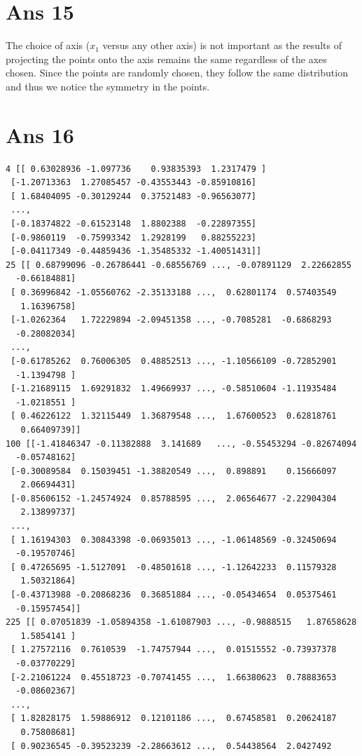 \documentclass[10pt]{article}
\begin{document}
\section*{Ans 15}
\begin{flushleft}
The choice of axis ($x_{1}$ versus any other axis) is not important as the results of projecting the points onto the axis remains the same regardless of the axes chosen. Since the points are randomly chosen, they follow the same distribution and thus we notice the symmetry in the points.\\
\end{flushleft}
\section*{Ans 16}
\begin{flushleft}
\begin{lstlisting}
4 [[ 0.63028936 -1.097736    0.93835393  1.2317479 ]
 [-1.20713363  1.27085457 -0.43553443 -0.85910816]
 [ 1.68404095 -0.30129244  0.37521483 -0.96563077]
 ..., 
 [-0.18374822 -0.61523148  1.8802388  -0.22897355]
 [-0.9860119  -0.75993342  1.2928199   0.88255223]
 [-0.04117349 -0.44859436 -1.35485332 -1.40051431]]
25 [[ 0.68799096 -0.26786441 -0.68556769 ..., -0.07891129  2.22662855
  -0.66184881]
 [ 0.36996842 -1.05560762 -2.35133188 ...,  0.62801174  0.57403549
   1.16396758]
 [-1.0262364   1.72229894 -2.09451358 ..., -0.7085281  -0.6868293
  -0.28082034]
 ..., 
 [-0.61785262  0.76006305  0.48852513 ..., -1.10566109 -0.72852901
  -1.1394798 ]
 [-1.21689115  1.69291832  1.49669937 ..., -0.58510604 -1.11935484
  -1.0218551 ]
 [ 0.46226122  1.32115449  1.36879548 ...,  1.67600523  0.62818761
   0.66409739]]
100 [[-1.41846347 -0.11382888  3.141689   ..., -0.55453294 -0.82674094
  -0.05748162]
 [-0.30089584  0.15039451 -1.38820549 ...,  0.898891    0.15666097
   2.06694431]
 [-0.85606152 -1.24574924  0.85788595 ...,  2.06564677 -2.22904304
   2.13899737]
 ..., 
 [ 1.16194303  0.30843398 -0.06935013 ..., -1.06148569 -0.32450694
  -0.19570746]
 [ 0.47265695 -1.5127091  -0.48501618 ..., -1.12642233  0.11579328
   1.50321864]
 [-0.43713988 -0.20868236  0.36851884 ..., -0.05434654  0.05375461
  -0.15957454]]
225 [[ 0.07051839 -1.05894358 -1.61087903 ..., -0.9888515   1.87658628
   1.5854141 ]
 [ 1.27572116  0.7610539  -1.74757944 ...,  0.01515552 -0.73937378
  -0.03770229]
 [-2.21061224  0.45518723 -0.70741455 ...,  1.66380623  0.78883653
  -0.08602367]
 ..., 
 [ 1.82828175  1.59886912  0.12101186 ...,  0.67458581  0.20624187
   0.75808681]
 [ 0.90236545 -0.39523239 -2.28663612 ...,  0.54438564  2.0427492

\end{lstlisting}
\end{flushleft}
\end{document}

